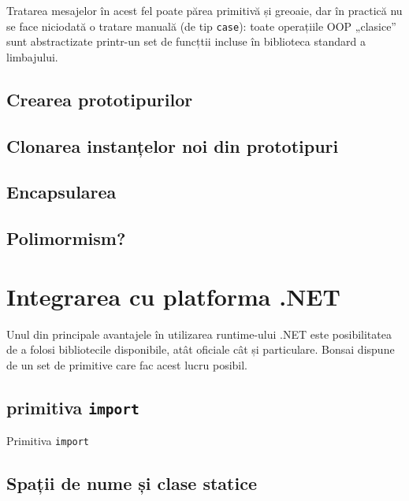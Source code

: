 \documentclass[12pt,a4paper]{memoir}
\begin{document}
Tratarea mesajelor în acest fel poate părea primitivă și greoaie, dar în practică nu se face niciodată o tratare manuală (de tip \texttt{case}): toate operațiile OOP „clasice” sunt abstractizate printr-un set de funcțtii incluse în biblioteca standard a limbajului.

\section{Crearea prototipurilor}


\section{Clonarea instanțelor noi din prototipuri}


\section{Encapsularea}


\section{Polimormism?}


\chapter{Integrarea cu platforma .NET}

Unul din principale avantajele în utilizarea runtime-ului .NET este posibilitatea de a folosi bibliotecile disponibile, atât oficiale cât și particulare. Bonsai dispune de un set de primitive care fac acest lucru posibil.

\section{primitiva \texttt{import}}

Primitiva \texttt{import}

\section{Spații de nume și clase statice}
\end{document}
